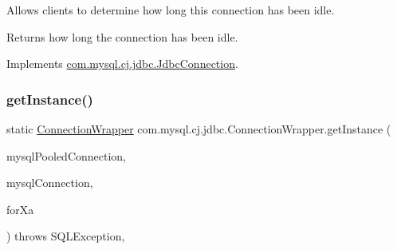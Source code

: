 Allows clients to determine how long this connection has been idle.

\begin{DoxyReturn}{Returns}
how long the connection has been idle. 
\end{DoxyReturn}


Implements \mbox{\hyperlink{interfacecom_1_1mysql_1_1cj_1_1jdbc_1_1_jdbc_connection_a3a242d2fb1e6c443f163d55f8bbd6cde}{com.\+mysql.\+cj.\+jdbc.\+Jdbc\+Connection}}.

\mbox{\label{classcom_1_1mysql_1_1cj_1_1jdbc_1_1_connection_wrapper_ad9866059f50d1008a2ffb298467736c0}} 
\subsubsection{\texorpdfstring{get\+Instance()}{getInstance()}}
{\footnotesize\ttfamily static \mbox{\hyperlink{classcom_1_1mysql_1_1cj_1_1jdbc_1_1_connection_wrapper}{Connection\+Wrapper}} com.\+mysql.\+cj.\+jdbc.\+Connection\+Wrapper.\+get\+Instance (\begin{DoxyParamCaption}\item[{\mbox{\hyperlink{classcom_1_1mysql_1_1cj_1_1jdbc_1_1_mysql_pooled_connection}{Mysql\+Pooled\+Connection}}}]{mysql\+Pooled\+Connection,  }\item[{\mbox{\hyperlink{interfacecom_1_1mysql_1_1cj_1_1jdbc_1_1_jdbc_connection}{Jdbc\+Connection}}}]{mysql\+Connection,  }\item[{boolean}]{for\+Xa }\end{DoxyParamCaption}) throws S\+Q\+L\+Exception\hspace{0.3cm}{\ttfamily [static]}, {\ttfamily [protected]}}

\mbox{\label{classcom_1_1mysql_1_1cj_1_1jdbc_1_1_connection_wrapper_ac3a18047b84616a9c5d751967464c880}} 
